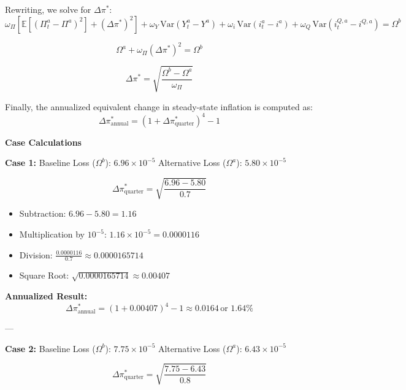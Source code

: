 \documentclass[12pt]{article}
\begin{document}
Rewriting, we solve for $\Delta \pi^*$:
\begin{equation}
\omega_\Pi [\mathbb{E}[(\Pi_t^a - \Pi^a)^2] + (\Delta \pi^*)^2] + \omega_Y \, \text{Var}(Y_t^a - Y^a) + \omega_i \, \text{Var}(i_t^a - i^a) + \omega_Q \, \text{Var}(i_t^{Q,a} - i^{Q,a}) = \Omega^b \tag{A.41}
\end{equation}

\begin{equation}
\Omega^a + \omega_\Pi (\Delta \pi^*)^2 = \Omega^b \tag{A.42}
\end{equation}

\begin{equation}
\Delta \pi^* = \sqrt{\frac{\Omega^b - \Omega^a}{\omega_\Pi}} \tag{A.43}
\end{equation}

Finally, the annualized equivalent change in steady-state inflation is computed as:
\begin{equation*}
\Delta \pi^*_{\text{annual}} = \left(1 + \Delta \pi^*_{\text{quarter}}\right)^4 - 1
\end{equation*}



\textbf{Case Calculations}

\textbf{Case 1:}  
Baseline Loss (\(\Omega^b\)): \(6.96 \times 10^{-5}\)  
Alternative Loss (\(\Omega^a\)): \(5.80 \times 10^{-5}\)  

 
\[
\Delta \pi^*_\text{quarter} = \sqrt{\frac{6.96 - 5.80}{0.7}}
\]

\begin{itemize}
    \item Subtraction: \(6.96 - 5.80 = 1.16\)
    \item Multiplication by \(10^{-5}\): \(1.16 \times 10^{-5} = 0.0000116\)
    \item Division: \(\frac{0.0000116}{0.7} \approx 0.0000165714\)
    \item Square Root: \(\sqrt{0.0000165714} \approx 0.00407\)
\end{itemize}



\textbf{Annualized Result:}  
\[
\Delta \pi^*_\text{annual} = \left(1 + 0.00407\right)^4 - 1 \approx 0.0164 \, \text{or } 1.64\%
\]

---

\textbf{Case 2:}  
Baseline Loss (\(\Omega^b\)): \(7.75 \times 10^{-5}\)  
Alternative Loss (\(\Omega^a\)): \(6.43 \times 10^{-5}\)  

 
\[
\Delta \pi^*_\text{quarter} = \sqrt{\frac{7.75 - 6.43}{0.8}}
\]
\end{document}
